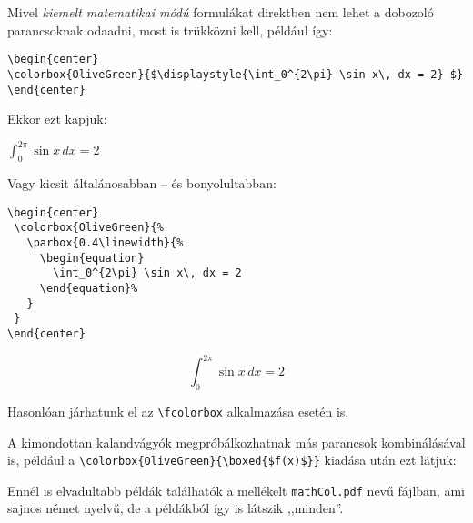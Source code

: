 \documentclass{article}
\begin{document}
\noindent Mivel \emph{kiemelt matematikai módú} formulákat direktben nem lehet a dobozoló parancsoknak odaadni, most is trükközni kell, például így:
\begin{verbatim}
\begin{center}
\colorbox{OliveGreen}{$\displaystyle{\int_0^{2\pi} \sin x\, dx = 2} $}
\end{center}
\end{verbatim} \vspace*{-0.5em}
Ekkor ezt kapjuk:

\begin{center}
\colorbox{OliveGreen}{$\displaystyle{\int_0^{2\pi} \sin x\, dx = 2} $}
\end{center}

\noindent Vagy kicsit általánosabban -- és bonyolultabban:
\begin{verbatim}
\begin{center}
 \colorbox{OliveGreen}{%
   \parbox{0.4\linewidth}{%
     \begin{equation}
       \int_0^{2\pi} \sin x\, dx = 2
     \end{equation}%
   }
 }
\end{center}
\end{verbatim} \vspace*{-0.5em}
\begin{center}
 \colorbox{OliveGreen}{%
   \parbox{0.4\linewidth}{%
     \begin{equation}
       \int_0^{2\pi} \sin x\, dx = 2
     \end{equation}%
   }
 }
\end{center}
\noindent Hasonlóan járhatunk el az \verb!\fcolorbox! alkalmazása esetén is.\par \bigskip

\noindent A kimondottan kalandvágyók megpróbálkozhatnak más parancsok kombinálásával is, például a \verb!\colorbox{OliveGreen}{\boxed{$f(x)$}}! kiadása után ezt látjuk:
\colorbox{OliveGreen}{}

\noindent Ennél is elvadultabb példák találhatók a mellékelt  \verb!mathCol.pdf! nevű fájlban, ami sajnos német nyelvű, de a példákból így is látszik ,,minden''.
\end{document}
